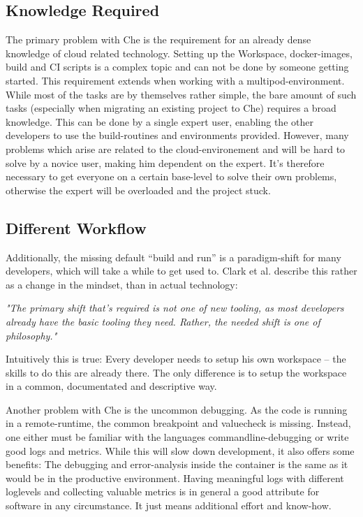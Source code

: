 \documentclass[utf8]{lni}
\begin{document}
\subsection{Knowledge Required}
The primary problem with Che is the requirement for an already dense knowledge of cloud related technology.
Setting up the Workspace, docker-images, build and CI scripts is a complex topic and can not be done by someone getting started. 
This requirement extends when working with a multipod-environment. 
While most of the tasks are by themselves rather simple, the bare amount of such tasks (especially when migrating an existing project to Che) requires a broad knowledge.
This can be done by a single expert user, enabling the other developers  to  use  the  build-routines and  environments provided. 
However, many problems which arise are related to the cloud-environement and will be hard to solve by a novice user, making him dependent on the expert. 
It's therefore necessary to get everyone on a certain base-level to solve their own problems, otherwise the expert will be overloaded and the project stuck.  

\subsection{Different Workflow}
Additionally, the missing default “build and run” is a paradigm-shift for many developers, which will take a while to get used to. 
Clark et al. \cite{CL14} describe this rather as a change in the mindset, than in actual technology: 

\begin{centering}
	\textit{"The primary shift that’s required is not one of new tooling, as most developers already have the basic tooling they need.\newline 
	Rather, the needed shift is one of philosophy."}
\end{centering}

Intuitively this is true: Every developer needs to setup his own workspace – the skills to do this are already there. 
The only difference is to setup the workspace in a common, documentated and descriptive way. 

Another problem with Che is the uncommon debugging. 
As the code is running in a remote-runtime, the common breakpoint  and  valuecheck
is  missing.  
Instead,  one  either must be familiar with the languages commandline-debugging or write good logs and metrics. 
While this will slow down development, it also offers some benefits: 
The debugging and error-analysis inside the container is the same as it would be in the productive environment. 
Having meaningful logs with different loglevels and collecting valuable metrics is 
in general a good attribute for software in any circumstance. 
It just means additional effort and know-how.  
\end{document}
